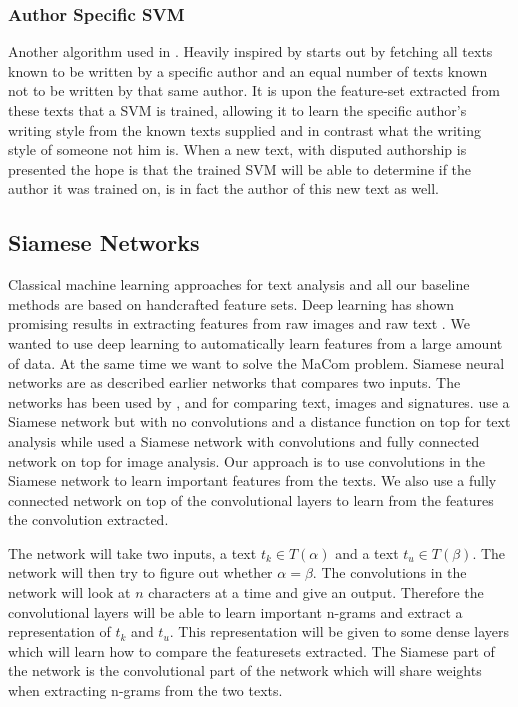 \subsubsection{Author Specific SVM}

Another algorithm used in \cite{US}. Heavily inspired by \cite{hansen2014}
starts out by fetching all texts known to be written by a specific author and an
equal number of texts known not to be written by that same author. It is upon
the feature-set extracted from these texts that a \gls{SVM} is trained, allowing
it to learn the specific author's writing style from the known texts supplied
and in contrast what the writing style of someone not him is. When a new text,
with disputed authorship is presented the hope is that the trained \gls{SVM}
will be able to determine if the author it was trained on, is in fact the author
of this new text as well.


\subsection{Siamese Networks}

Classical machine learning approaches for text analysis and all our baseline
methods are based on handcrafted feature sets. Deep learning has shown
promising results in extracting features from raw images and raw text
\cite{hongxiaosunyuan}. We wanted to use deep learning to automatically learn
features from a large amount of data. At the same time we want to solve the
MaCom problem. Siamese neural networks are as described earlier networks that
compares two inputs. The networks has been used by \cite{Koch2015SiameseNN},
\cite{NIPS1993_769} and \cite{qian:2018} for comparing text, images and
signatures. \cite{qian:2018} use a Siamese network but with no convolutions and
a distance function on top for text analysis while \cite{Koch2015SiameseNN}
used a Siamese network with convolutions and fully connected network on top for
image analysis. Our approach is to use convolutions in the Siamese network to
learn important features from the texts. We also use a fully connected network
on top of the convolutional layers to learn from the features the convolution
extracted.

The network will take two inputs, a text $t_k \in T(\alpha)$ and a text $t_u \in
T(\beta)$. The network will then try to figure out whether $\alpha = \beta$.
The convolutions in the network will look at $n$ characters at a time and give
an output. Therefore the convolutional layers will be able to learn important
n-grams and extract a representation of $t_k$ and $t_u$. This representation
will be given to some dense layers which will learn how to compare the
featuresets extracted. The Siamese part of the network is the convolutional part
of the network which will share weights when extracting n-grams from the two
texts.

